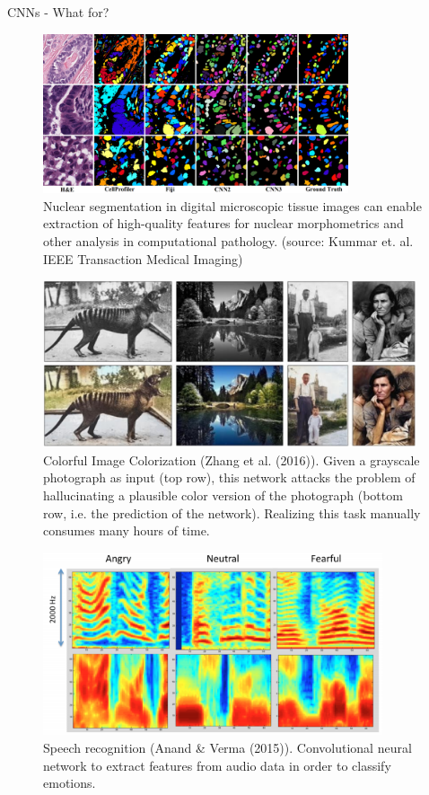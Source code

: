 \begin{vbframe}{CNNs - What for?}
  \begin{figure}
    \centering
    \includegraphics[width=9cm]{figure/instanceseg.png}
    \caption{Nuclear segmentation in digital microscopic tissue images can enable extraction of high-quality features for nuclear morphometrics and other analysis in computational pathology. (source: Kummar et. al. IEEE Transaction Medical Imaging) }
  \end{figure}
\framebreak

  \begin{figure}
    \centering
    \includegraphics[width=11cm]{figure/colorization.png}
    \caption{Colorful Image Colorization (Zhang et al. (2016)). Given a grayscale photograph as input (top row), this network attacks the problem of hallucinating a plausible color version of the photograph (bottom row, i.e. the prediction of the network). Realizing this task manually consumes many hours of time.}
  \end{figure}
\framebreak


  \begin{figure}
    \centering
    \includegraphics[width=10cm]{figure/speech.png}
    \caption{Speech recognition (Anand \& Verma (2015)). Convolutional neural network to extract features from audio data in order to classify emotions.}
  \end{figure}
\end{vbframe}

